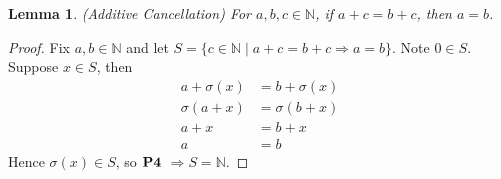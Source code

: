 \documentclass{article}
\newtheorem*{lemma}{Lemma}
\begin{document}
\hfill\break
\begin{lemma}{(Additive Cancellation)}
	For $a,b,c \in \mathbb{N}$, if $a+c=b+c$, then $a=b$.
\end{lemma}
\begin{proof}
	Fix $a,b\in\mathbb{N}$ and let
  	$S=\{c\in\mathbb{N}\mid a+c=b+c\Rightarrow a=b\}$.
  	Note $0\in S$. Suppose $x\in S$, then
  	\begin{align*}
    	a+\sigma(x) &= b+\sigma(x)          \\
    	\sigma(a+x) &= \sigma(b+x) \tag{2}  \\
                a+x &= b+x         \tag{P3} \\
                  a &= b           \tag{IH}
  \end{align*}
  Hence $\sigma(x) \in S$, so $\bf{P4}$
  $\Rightarrow S = \mathbb{N}$.
\end{proof}
\end{document}
